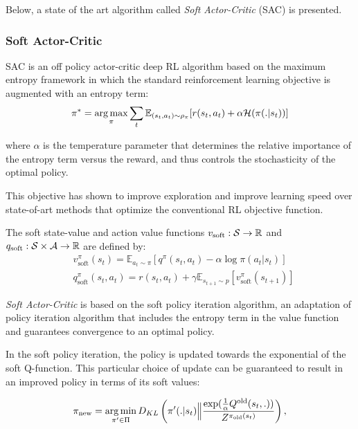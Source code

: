 Below, a state of the art algorithm called \textit{Soft Actor-Critic} (SAC) is presented.

\subsubsection{Soft Actor-Critic}
\label{sec:SAC}
SAC \cite{SAC, SAC_modified} is an off policy actor-critic deep RL algorithm based on the maximum entropy framework in which the standard reinforcement learning
objective is augmented with an entropy term:
\begin{equation*}
    \pi^* = \operatorname*{arg\,max}_\pi \sum_t \mathbb{E}_{(s_t, a_t) \sim \rho_\pi}[r(s_t, a_t) + \alpha \mathcal{H}(\pi(.|s_t))]
\end{equation*}

where $\alpha$ is the temperature parameter that determines the relative importance of the entropy term versus the reward, and thus controls the stochasticity
of the optimal policy.

This objective has shown to improve exploration and improve learning speed over state-of-art methods that optimize the conventional RL objective function.

\begin{definition}
    The soft state-value and action value functions  $v_{\text{soft}}: \mathcal{S} \to \mathbb{R}$ and $q_{\text{soft}}: \mathcal{S} \times \mathcal{A} \to \mathbb{R}$ are defined by:
    \begin{align*} 
        &v_\text{soft}^\pi(s_t) = \mathbb{E}_{a_t \sim \pi }[q^\pi(s_t, a_t) - \alpha \log \pi(a_t | s_t)] \\
        &q_\text{soft}^\pi(s_t, a_t) = r(s_t, a_t) + \gamma \mathbb{E}_{s_{t+1} \sim \mathit{p}}[v_\text{soft}^\pi(s_{t+1})]
    \end{align*}
\end{definition}

\textit{Soft Actor-Critic} is based on the soft policy iteration algorithm, an adaptation of policy iteration algorithm that includes the entropy term in the value function
and guarantees convergence to an optimal policy.

In the soft policy iteration, the policy is updated towards the exponential of the soft Q-function. This particular choice of update can be guaranteed
to result in an improved policy in terms of its soft values:

\begin{equation}
    \label{eq:soft_policy_improvement}
    \pi_\text{new} = \operatorname*{arg\,min}_{\pi' \in \Pi} D_{KL} \left(\pi'(.|s_t) \Big\Vert \frac{\exp(\frac{1}{\alpha}Q^\text{old}(s_t, .))}{Z^{\pi_{\text{old}}(s_t)}}\right),
\end{equation}

